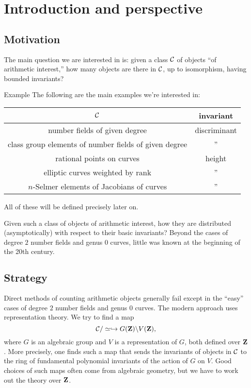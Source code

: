 
\section{Introduction and perspective}





\subsection{Motivation}

The main question we are interested in is: given a class $\mathcal{C}$ of objects ``of 
arithmetic interest,'' how many objects are there in $\mathcal{C}$, up to isomorphism, 
having bounded invariants? 

\begin{enonce}[remark]{Example}
The following are the main examples we're interested in: 
\begin{center}
\begin{tabular}{c|c}
$\mathcal{C}$ & invariant \\ \hline
number fields of given degree & discriminant \\
class group elements of number fields of given degree & '' \\
rational points on curves & height \\
elliptic curves weighted by rank & '' \\
$n$-Selmer elements of Jacobians of curves & '' 
\end{tabular}
\end{center}
All of these will be defined precisely later on. 
\end{enonce}

Given such a class of objects of arithmetic interest, how they are distributed 
(asymptotically) with respect to their basic invariants? Beyond the cases of 
degree $2$ number fields and genus $0$ curves, little was known at the 
beginning of the 20th century. 





\subsection{Strategy}

Direct methods of counting arithmetic objects generally fail except in the 
``easy'' cases of degree $2$ number fields and genus $0$ curves. The modern 
approach uses representation theory. We try to find a map 
\[
  \mathcal{C}/\simeq \hookrightarrow G(\mathbf{Z})\backslash V(\mathbf{Z}) ,
\]
where $G$ is an algebraic group and $V$ is a representation of $G$, both 
defined over $\mathbf{Z}$. More precisely, one finds such a map that sends the 
invariants of objects in $\mathcal{C}$ to the ring of fundamental polynomial 
invariants of the action of $G$ on $V$. Good choices of such maps often come 
from algebraic geometry, but we have to work out the theory over $\mathbf{Z}$. 

